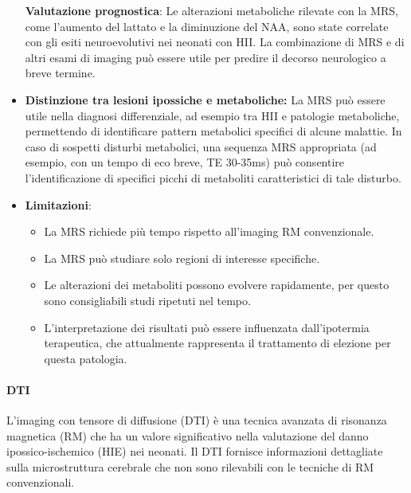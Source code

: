 \begin{itemize}
	\textbf{Valutazione prognostica}: Le alterazioni metaboliche rilevate con la MRS, come l'aumento del lattato e la diminuzione del NAA, sono state correlate con gli esiti neuroevolutivi nei neonati con HII. La combinazione di MRS e di altri esami di imaging può essere utile per predire il decorso neurologico a breve termine.
	\item
	\textbf{Distinzione tra lesioni ipossiche e metaboliche:} La MRS può essere utile nella diagnosi differenziale, ad esempio tra HII e patologie metaboliche, permettendo di identificare pattern metabolici specifici di alcune malattie. In caso di sospetti disturbi metabolici, una sequenza MRS appropriata (ad esempio, con un tempo di eco breve, TE 30-35ms) può consentire l'identificazione di specifici picchi di metaboliti caratteristici di tale disturbo.
	\item
	\textbf{Limitazioni}:
	
	\begin{itemize}
		\tightlist
		\item
		La MRS richiede più tempo rispetto all'imaging RM convenzionale.
		\item
		La MRS può studiare solo regioni di interesse specifiche.
		\item
		Le alterazioni dei metaboliti possono evolvere rapidamente, per questo sono consigliabili studi ripetuti nel tempo.
		\item
		L'interpretazione dei risultati può essere influenzata dall'ipotermia terapeutica, che attualmente rappresenta il trattamento di elezione per questa patologia.
	\end{itemize}
\end{itemize}

\paragraph{DTI}

L'imaging con tensore di diffusione (DTI) è una tecnica avanzata di risonanza magnetica (RM) che ha un valore significativo nella valutazione del danno ipossico-ischemico (HIE) nei neonati. Il DTI fornisce informazioni dettagliate sulla microstruttura cerebrale che non sono rilevabili con le tecniche di RM convenzionali.

